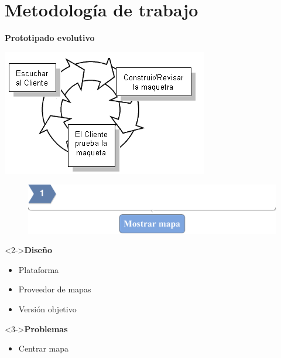 \section{Metodología de trabajo}

\begin{slide}
  \begin{block}{\textbf{Prototipado evolutivo}}
    \begin{center}
      \includegraphics[height=0.5\textheight]{img/prototipo.png}
    \end{center}
  \end{block}
\end{slide}

\begin{slide}
  \begin{center}
    \begin{figure}[!h]
      \includegraphics[height=0.27\textheight]{img/ite1.png}
    \end{figure}
    \vspace{0.5cm}
    \begin{minipage}[b]{0.4\linewidth}
      \begin{block}<2->{\textbf{Diseño}}
        \begin{itemize}
          \item Plataforma
          \item Proveedor de mapas
          \item Versión objetivo
        \end{itemize}
      \end{block}
    \end{minipage}
    \hspace{0.5cm}
    \begin{minipage}[b]{0.4\linewidth}
      \begin{block}<3->{\textbf{Problemas}}
        \begin{itemize}
          \item Centrar mapa
        \end{itemize}
      \end{block}
    \end{minipage}
  \end{center}
\end{slide}

